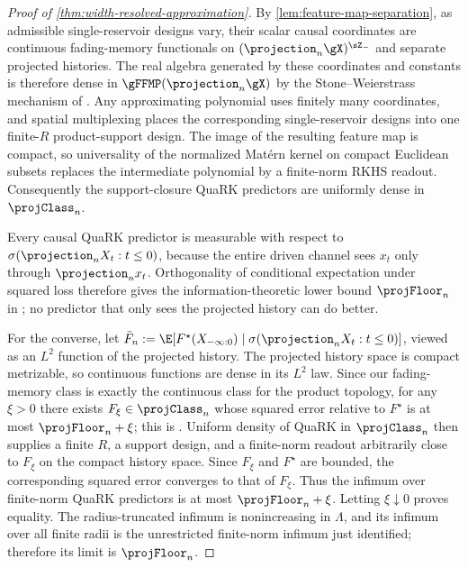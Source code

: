 \begin{proof}[Proof of \cref{thm:width-resolved-approximation}]
By \cref{lem:feature-map-separation}, as admissible single-reservoir designs
vary, their scalar causal coordinates are continuous fading-memory functionals
on $(\projection_n\gX)^{\sZ_-}$ and separate projected histories.  The real
algebra generated by these coordinates and constants is therefore dense in
$\gFFMP(\projection_n\gX)$ by the Stone--Weierstrass mechanism of
\citet{MonzaniPrati2025}.  Any approximating polynomial uses finitely many
coordinates, and spatial multiplexing places the corresponding single-reservoir
designs into one finite-$R$ product-support design.  The image of the resulting
feature map is compact, so universality of the normalized Mat\'ern kernel on
compact Euclidean subsets \citep{SriperumbudurEtAl2011} replaces the
intermediate polynomial by a finite-norm RKHS readout.  Consequently the
support-closure QuaRK predictors are uniformly dense in $\projClass_n$.

Every causal QuaRK predictor is measurable with respect to
$\sigma(\projection_nX_t:t\leq0)$, because the entire driven channel sees
$x_t$ only through $\projection_nx_t$.  Orthogonality of conditional
expectation under squared loss therefore gives the information-theoretic lower
bound $\projFloor_n$ in ; no predictor
that only sees the projected history can do better.

For the converse, let
$\bar F_n:=\E[F^\star(X_{-\infty:0})\mid
\sigma(\projection_nX_t:t\leq0)]$, viewed as an $L^2$ function of the projected
history.  The projected history space is compact metrizable, so continuous
functions are dense in its $L^2$ law.  Since our fading-memory class is exactly
the continuous class for the product topology, for any $\xi>0$ there exists
$F_\xi\in\projClass_n$ whose squared error relative to $F^\star$ is at most
$\projFloor_n+\xi$; this is .  Uniform
density of QuaRK in $\projClass_n$ then supplies a finite $R$, a support design,
and a finite-norm readout arbitrarily close to $F_\xi$ on the compact history
space.  Since $F_\xi$ and $F^\star$ are bounded, the corresponding squared
error converges to that of $F_\xi$.  Thus the infimum over finite-norm QuaRK
predictors is at most $\projFloor_n+\xi$.  Letting $\xi\downarrow0$ proves
equality.  The radius-truncated infimum is nonincreasing in $\Lambda$, and its
infimum over all finite radii is the unrestricted finite-norm infimum just
identified; therefore its limit is $\projFloor_n$.
\end{proof}

